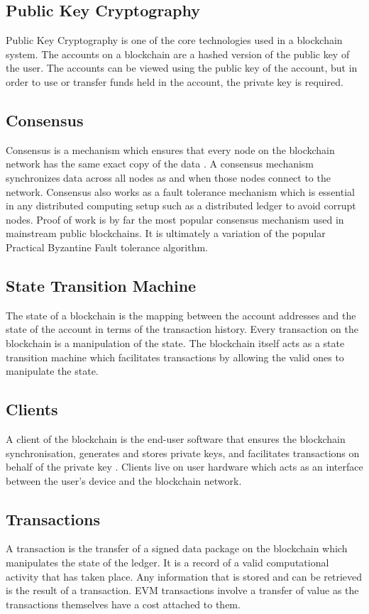 \documentclass[a4paper,twoside,phd]{BYUPhys}
\begin{document}
\subsection{Public Key Cryptography}
Public Key Cryptography is one of the core technologies used in a blockchain system. The accounts on a blockchain are a hashed version of the public key of the user\cite{}. The accounts can be viewed using the public key of the account, but in order to use or transfer funds held in the account, the private key is required.
\subsection{Consensus}
Consensus is a mechanism which ensures that every node on the blockchain network has the same exact copy of the data \cite{}. A consensus mechanism synchronizes data across all nodes as and when those nodes connect to the network. Consensus also works as a fault tolerance mechanism which is essential in any distributed computing setup such as a distributed ledger to avoid corrupt nodes. Proof of work is by far the most popular consensus mechanism used in mainstream public blockchains. It is ultimately a variation of the popular Practical Byzantine Fault tolerance algorithm.
\subsection{State Transition Machine}
The state of a blockchain is the mapping between the account addresses and the state of the account in terms of the transaction history\cite{}. Every transaction on the blockchain is a manipulation of the state. The blockchain itself acts as a state transition machine which facilitates transactions by allowing the valid ones to manipulate the state.
\subsection{Clients}
A client of the blockchain is the end-user software that ensures the blockchain synchronisation, generates and stores private keys, and facilitates transactions on behalf of the private key \cite{}. Clients live on user hardware which acts as an interface between the user's device and the blockchain network.
\subsection{Transactions}
A transaction is the transfer of a signed data package on the blockchain which manipulates the state of the ledger\cite{}. It is a record of a valid computational activity that has taken place. Any information that is stored and can be retrieved is the result of a transaction. EVM transactions involve a transfer of value as the transactions themselves have a cost attached to them. 
\end{document}
